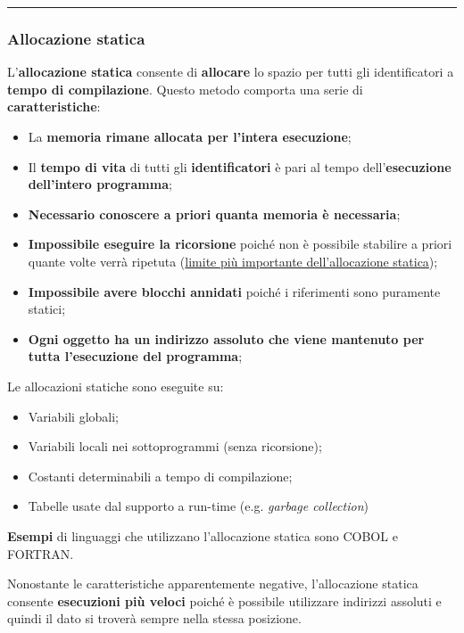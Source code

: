 \documentclass[a4paper]{article}
\newcommand{\longline}{\noindent\rule{\textwidth}{0.4pt}}
\begin{document}
	\longline
 	
 	\subsubsection{Allocazione statica}
 	
 	L'\textbf{allocazione statica} consente di \textbf{allocare} lo spazio per tutti gli identificatori a \textbf{tempo di compilazione}. Questo metodo comporta una serie di \textbf{caratteristiche}:
 	\begin{itemize}
 		\item La \textbf{memoria rimane allocata per l'intera esecuzione};
 		
 		\item Il \textbf{tempo di vita} di tutti gli \textbf{identificatori} è pari al tempo dell'\textbf{esecuzione dell'intero programma};
 		
 		\item \textbf{Necessario conoscere a priori quanta memoria è necessaria};
 		
 		\item \textbf{Impossibile eseguire la ricorsione} poiché non è possibile stabilire a priori quante volte verrà ripetuta (\underline{limite più importante dell'allocazione statica});
 		
 		\item \textbf{Impossibile avere blocchi annidati} poiché i riferimenti sono puramente statici;
 		
 		\item \textbf{Ogni oggetto ha un indirizzo assoluto che viene mantenuto per tutta l'esecuzione del programma};
 	\end{itemize}
 	Le allocazioni statiche sono eseguite su:
 	\begin{itemize}
 		\item Variabili globali;
 		\item Variabili locali nei sottoprogrammi (senza ricorsione);
 		\item Costanti determinabili a tempo di compilazione;
 		\item Tabelle usate dal supporto a run-time (e.g. \emph{garbage collection})
 	\end{itemize}
 	\textcolor{Green4}{\textbf{Esempi}} di linguaggi che utilizzano l'allocazione statica sono COBOL e FORTRAN.\newline
 	
 	\noindent
 	Nonostante le caratteristiche apparentemente negative, l'allocazione statica consente \textbf{esecuzioni più veloci} poiché è possibile utilizzare indirizzi assoluti e quindi il dato si troverà sempre nella stessa posizione.\newpage
 	
\end{document}
